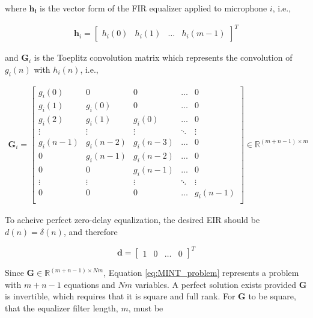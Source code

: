\noindent
where $\boldsymbol{h_i}$ is the vector form of the FIR equalizer applied to microphone $i$, i.e.,

\begin{eqnarray}
	\boldsymbol{h}_i = 
		\begin{bmatrix}
			h_i(0) & h_i(1) & \dots & h_i(m-1)
		\end{bmatrix}^T
\end{eqnarray}

\noindent
and $\boldsymbol{G}_i$ is the Toeplitz convolution matrix which represents the convolution of $g_i(n)$ with $h_i(n)$, i.e.,

\begin{eqnarray}
	\boldsymbol{G}_i = 
	\begin{bmatrix} 
		g_i(0)     & 0           & 0              & \dots    & 0  \\
		g_i(1)     & g_i(0)    & 0              & \dots    & 0  \\
		g_i(2)    & g_i(1)     & g_i(0)      & \dots    & 0  \\
		\vdots    & \vdots    & \vdots     & \ddots & \vdots  \\
		g_i(n-1) & g_i(n-2) & g_i(n-3) & \dots   & 0 \\
		0            & g_i(n-1)  & g_i(n-2) & \dots   & 0 \\
		0            & 0             & g_i(n-1) & \dots   & 0 \\
		\vdots    & \vdots    & \vdots     & \ddots & \vdots  \\
		0            & 0             & 0             & \dots   & g_i(n-1) \\
	\end{bmatrix} 
	\in \mathbb{R}^{(m+n-1)\times m}
\end{eqnarray}

\noindent
To acheive perfect zero-delay equalization, the desired EIR should be $d(n)=\delta(n)$, and therefore

\begin{equation}
	\boldsymbol{d} =
		\begin{bmatrix}
			1 & 0 & \dots & 0
		\end{bmatrix}^T
\end{equation}

Since $\boldsymbol{G} \in \mathbb{R}^{(m+n-1)\times Nm}$, Equation \ref{eq:MINT_problem} represents a problem with $m+n-1$ equations and $Nm$ variables. A perfect solution exists provided $\boldsymbol{G}$ is invertible, which requires that it is square and full rank. For $\boldsymbol{G}$ to be square, that the equalizer filter length, $m$, must be

